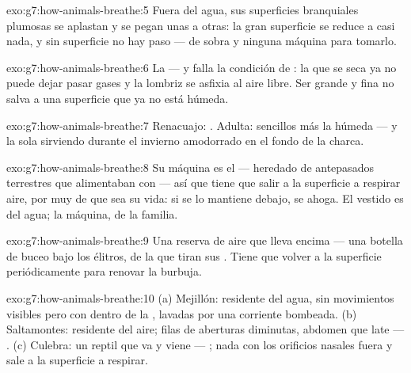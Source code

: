 \begin{solution}{exo:g7:how-animals-breathe:5}
Fuera del agua, sus superficies branquiales plumosas se aplastan y se
pegan unas a otras: la gran superficie se reduce a casi nada, y sin
superficie no hay paso ---  de sobra y ninguna máquina para
tomarlo.
\end{solution}

\begin{solution}{exo:g7:how-animals-breathe:6}
La  --- y falla la condición de : la  que
se seca ya no puede dejar pasar gases y la lombriz se asfixia al aire
libre. Ser grande y fina no salva a una superficie que ya no está
húmeda.
\end{solution}

\begin{solution}{exo:g7:how-animals-breathe:7}
Renacuajo: . Adulta:  sencillos más la  húmeda ---
y la  sola sirviendo durante el invierno amodorrado en el fondo de
la charca.
\end{solution}

\begin{solution}{exo:g7:how-animals-breathe:8}
Su máquina es el  --- heredado de antepasados terrestres que
alimentaban con  --- así que tiene que salir a la superficie a
respirar aire, por muy de  que sea su vida: si se lo mantiene
debajo, se ahoga. El vestido es del agua; la máquina, de la familia.
\end{solution}

\begin{solution}{exo:g7:how-animals-breathe:9}
Una reserva de aire que lleva encima --- una botella de buceo bajo los
élitros, de la que tiran sus . Tiene que volver a la superficie
periódicamente para renovar la burbuja.
\end{solution}

\begin{solution}{exo:g7:how-animals-breathe:10}
(a) Mejillón: residente del agua, sin movimientos visibles pero con
 dentro de la , lavadas por una corriente bombeada. (b)
Saltamontes: residente del aire; filas de aberturas diminutas, abdomen
que late --- . (c) Culebra: un reptil que va y viene ---
; nada con los orificios nasales fuera y sale a la superficie a
respirar.
\end{solution}

